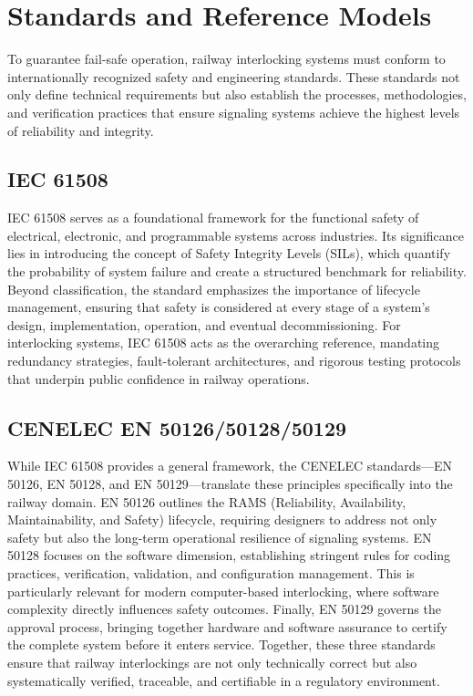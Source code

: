 \section{Standards and Reference Models}
To guarantee fail-safe operation, railway interlocking systems must conform to internationally recognized safety and engineering standards. These standards not only define technical requirements but also establish the processes, methodologies, and verification practices that ensure signaling systems achieve the highest levels of reliability and integrity.

\subsection{IEC 61508}
IEC 61508 serves as a foundational framework for the functional safety of electrical, electronic, and programmable systems across industries. Its significance lies in introducing the concept of Safety Integrity Levels (SILs), which quantify the probability of system failure and create a structured benchmark for reliability. Beyond classification, the standard emphasizes the importance of lifecycle management, ensuring that safety is considered at every stage of a system’s design, implementation, operation, and eventual decommissioning. For interlocking systems, IEC 61508 acts as the overarching reference, mandating redundancy strategies, fault-tolerant architectures, and rigorous testing protocols that underpin public confidence in railway operations.

\subsection{CENELEC EN 50126/50128/50129}
While IEC 61508 provides a general framework, the CENELEC standards—EN 50126, EN 50128, and EN 50129—translate these principles specifically into the railway domain. EN 50126 outlines the RAMS (Reliability, Availability, Maintainability, and Safety) lifecycle, requiring designers to address not only safety but also the long-term operational resilience of signaling systems. EN 50128 focuses on the software dimension, establishing stringent rules for coding practices, verification, validation, and configuration management. This is particularly relevant for modern computer-based interlocking, where software complexity directly influences safety outcomes. Finally, EN 50129 governs the approval process, bringing together hardware and software assurance to certify the complete system before it enters service. Together, these three standards ensure that railway interlockings are not only technically correct but also systematically verified, traceable, and certifiable in a regulatory environment.

